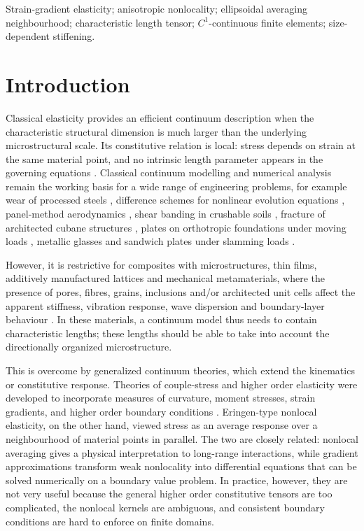 \documentclass[final,3p,times,fleqn]{elsarticle}
\begin{document}
\begin{frontmatter}
\begin{keyword}
Strain-gradient elasticity; anisotropic nonlocality; ellipsoidal averaging neighbourhood; characteristic length tensor; \(C^1\)-continuous finite elements; size-dependent stiffening.
\end{keyword}

\end{frontmatter}

\section{Introduction}
Classical elasticity provides an efficient continuum description when the characteristic structural dimension is much larger than the underlying microstructural scale. Its constitutive relation is local: stress depends on strain at the same material point, and no intrinsic length parameter appears in the governing equations \cite{Love1927}. Classical continuum modelling and numerical analysis remain the working basis for a wide range of engineering problems, for example wear of processed steels \cite{Yan2022Tribo}, difference schemes for nonlinear evolution equations \cite{Dong2024EJDE}, panel-method aerodynamics \cite{Xie2025AST}, shear banding in crushable soils \cite{Bai2026JRMGE}, fracture of architected cubane structures \cite{He2026EFM}, plates on orthotropic foundations under moving loads \cite{Zhang2026PLoSOne}, metallic glasses \cite{Ding2026RareMetals} and sandwich plates under slamming loads \cite{Guo2026TWS}.


However, it is restrictive for composites with microstructures, thin films, additively manufactured lattices and mechanical metamaterials, where the presence of pores, fibres, grains, inclusions and/or architected unit cells affect the apparent stiffness, vibration response, wave dispersion and boundary-layer behaviour \cite{Jiao2023,Sarar2024}. In these materials, a continuum model thus needs to contain characteristic lengths; these lengths should be able to take into account the directionally organized microstructure.


This is overcome by generalized continuum theories, which extend the kinematics or constitutive response. Theories of couple-stress and higher order elasticity were developed to incorporate measures of curvature, moment stresses, strain gradients, and higher order boundary conditions \cite{Toupin1962,MindlinTiersten1962,Mindlin1964,Mindlin1965}. Eringen-type nonlocal elasticity, on the other hand, viewed stress as an average response over a neighbourhood of material points \cite{EringenEdelen1972,Eringen1972Polar,Eringen1983} in parallel. The two are closely related: nonlocal averaging gives a physical interpretation to long-range interactions, while gradient approximations transform weak nonlocality into differential equations that can be solved numerically on a boundary value problem. In practice, however, they are not very useful because the general higher order constitutive tensors are too complicated, the nonlocal kernels are ambiguous, and consistent boundary conditions are hard to enforce on finite domains.
\end{document}
